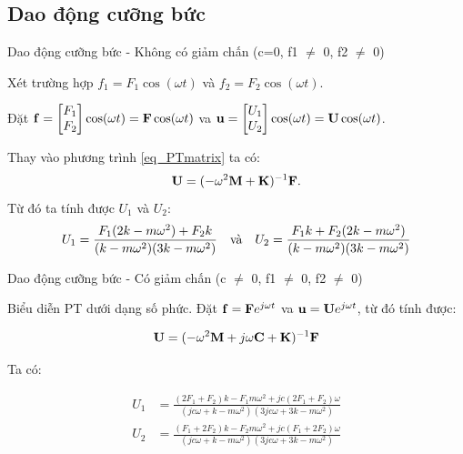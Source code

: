 \documentclass[aspectratio=169, t]{beamer} %
\begin{document}
\subsection{Dao động cưỡng bức}

\begin{frame}{Dao động cưỡng bức - Không có giảm chấn (c=0, f1 $\neq$ 0, f2 $\neq$ 0)}

\vspace{5mm}

Xét trường hợp $f_1 = F_1\cos(\omega t)$ và $f_2 = F_2\cos(\omega t)$.

Đặt ${\bf f} = \begin{bmatrix} F_1 \\ F_2\end{bmatrix}\cos(\omega t) = {\bf F}\cos(\omega t)$ va ${\bf u} = \begin{bmatrix} U_1 \\ U_2\end{bmatrix}\cos(\omega t) = {\bf U}\cos(\omega t)$.

Thay vào phương trình \eqref{eq_PTmatrix} ta có:
\begin{equation}
    {\bf U} = (-\omega^2{\bf M}+{\bf K})^{-1} {\bf F}.
\end{equation}
Từ đó ta tính được $U_1$ và $U_2$:
\begin{equation}
     U_1 = \frac{F_1(2k-m\omega^2)+F_2k}{(k-m\omega^2)(3k-m\omega^2)} \quad \hbox{và} \quad U_2 = \frac{F_1k+F_2(2k-m\omega^2)}{(k-m\omega^2)(3k-m\omega^2)}
\end{equation}
\end{frame}

\begin{frame}{Dao động cưỡng bức - Có giảm chấn (c $\neq$ 0, f1 $\neq$ 0, f2 $\neq$ 0)}

\vspace{7mm}

Biểu diễn PT dưới dạng số phức. Đặt ${\bf f} = {\bf F}e^{j\omega t}$ va ${\bf u} = {\bf U}e^{j\omega t}$, từ đó tính được:

\begin{equation}
    {\bf U} = (-\omega^2{\bf M} + j\omega{\bf C} + {\bf K})^{-1} {\bf F}
\end{equation}

Ta có:

\begin{equation}\label{eq_nghiemphuc}
    \begin{aligned}
        {U}_1 &=\frac{\left(2 F_1+F_2\right) k-F_1 m \omega^2+j c\left(2 F_1+F_2\right) \omega}{\left(j c \omega+k-m \omega^2\right)\left(3 j c \omega+3 k-m \omega^2\right)}\\
        {U}_2 &=\frac{\left(F_1+2 F_2\right) k-F_2 m \omega^2+j c\left(F_1+2 F_2\right) \omega}{\left(j c \omega+k-m \omega^2\right)\left(3 j c \omega+3 k-m \omega^2\right)}
    \end{aligned}
\end{equation}
\end{frame}
\end{document}
